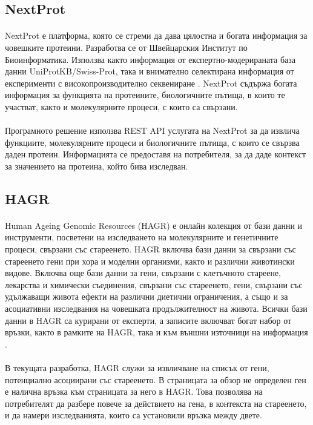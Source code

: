 \documentclass[pdftex,cyrillic,14pt,a4page,twoside,openright]{extreport}
\begin{document}
\subsection{NextProt}\label{sec:nextprot}
\paragraph{}
NextProt е платформа, която се стреми да дава цялостна и богата информация за човешките протеини. Разработва се от Швейцарския Институт по Биоинформатика. Използва както информация от експертно-модерираната база данни UniProtKB/Swiss-Prot, така и внимателно селектирана информация от експерименти с високопроизводително секвениране \cite{lane2011}. NextProt съдържа богата информация за функцията на протеините, биологичните пътища, в които те участват, както и молекулярните процеси, с които са свързани.

\paragraph{}
Програмното решение използва REST API услугата на NextProt за да извлича функциите, молекулярните процеси и биологичните пътища, с които се свързва даден протеин. Информацията се предоставя на потребителя, за да даде контекст за значението на протеина, който бива изследван.

\subsection{HAGR}
\paragraph{}
Human Ageing Genomic Resources (HAGR) е онлайн колекция от бази данни и инструменти, посветени на изследването на молекулярните и генетичните процеси, свързани със стареенето. HAGR включва бази данни за свързани със стареенето гени при хора и моделни организми, както и различни животински видове. Включва още бази данни за гени, свързани с клетъчното стареене, лекарства и химически съединения, свързани със стареенето, гени, свързани със удължаващи живота ефекти на различни диетични ограничения, а също и за асоциативни изследвания на човешката продължителност на живота. Всички бази данни в HAGR са курирани от експерти, а записите включват богат набор от връзки, както в рамките на HAGR, така и към външни източници на информация \cite{tacutu2018}.

\paragraph{}
В текущата разработка, HAGR служи за извличване на списък от гени, потенциално асоциирани със стареенето. В страницата за обзор не определен ген е налична връзка към страницата за него в HAGR. Това позволява на потребителят да разбере повече за действието на гена, в контекста на стареенето, и да намери изследванията, които са установили връзка между двете.
\end{document}
